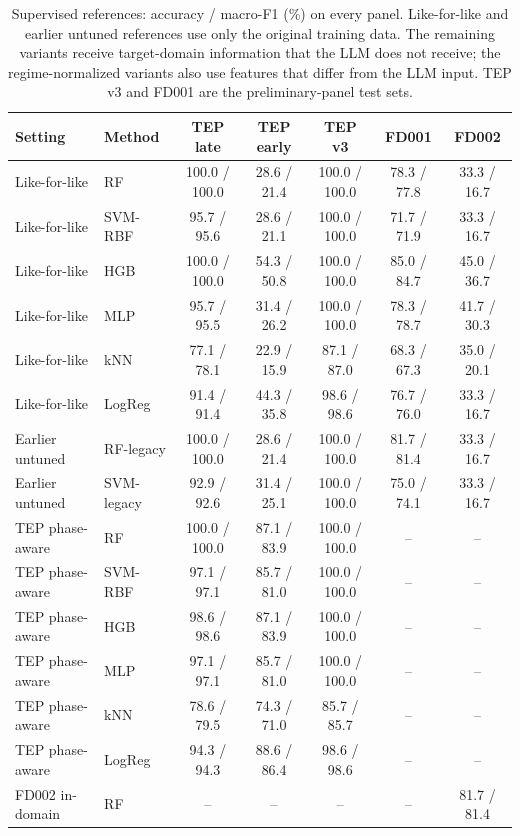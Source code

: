 \begin{table}[htbp]\centering\scriptsize
\caption{Supervised references: accuracy / macro-F1 (\%) on every panel. Like-for-like and earlier untuned references use only the original training data. The remaining variants receive target-domain information that the LLM does not receive; the regime-normalized variants also use features that differ from the LLM input. TEP v3 and FD001 are the preliminary-panel test sets.}
\label{tab:sh_baselines}
\setlength{\tabcolsep}{3pt}
\begin{tabular}{@{}llccccc@{}}\toprule
Setting & Method & TEP late & TEP early & TEP v3 & FD001 & FD002 \\\midrule
Like-for-like & RF & 100.0 / 100.0 & 28.6 / 21.4 & 100.0 / 100.0 & 78.3 / 77.8 & 33.3 / 16.7 \\
Like-for-like & SVM-RBF & 95.7 / 95.6 & 28.6 / 21.1 & 100.0 / 100.0 & 71.7 / 71.9 & 33.3 / 16.7 \\
Like-for-like & HGB & 100.0 / 100.0 & 54.3 / 50.8 & 100.0 / 100.0 & 85.0 / 84.7 & 45.0 / 36.7 \\
Like-for-like & MLP & 95.7 / 95.5 & 31.4 / 26.2 & 100.0 / 100.0 & 78.3 / 78.7 & 41.7 / 30.3 \\
Like-for-like & kNN & 77.1 / 78.1 & 22.9 / 15.9 & 87.1 / 87.0 & 68.3 / 67.3 & 35.0 / 20.1 \\
Like-for-like & LogReg & 91.4 / 91.4 & 44.3 / 35.8 & 98.6 / 98.6 & 76.7 / 76.0 & 33.3 / 16.7 \\
Earlier untuned & RF-legacy & 100.0 / 100.0 & 28.6 / 21.4 & 100.0 / 100.0 & 81.7 / 81.4 & 33.3 / 16.7 \\
Earlier untuned & SVM-legacy & 92.9 / 92.6 & 31.4 / 25.1 & 100.0 / 100.0 & 75.0 / 74.1 & 33.3 / 16.7 \\
TEP phase-aware & RF & 100.0 / 100.0 & 87.1 / 83.9 & 100.0 / 100.0 & -- & -- \\
TEP phase-aware & SVM-RBF & 97.1 / 97.1 & 85.7 / 81.0 & 100.0 / 100.0 & -- & -- \\
TEP phase-aware & HGB & 98.6 / 98.6 & 87.1 / 83.9 & 100.0 / 100.0 & -- & -- \\
TEP phase-aware & MLP & 97.1 / 97.1 & 85.7 / 81.0 & 100.0 / 100.0 & -- & -- \\
TEP phase-aware & kNN & 78.6 / 79.5 & 74.3 / 71.0 & 85.7 / 85.7 & -- & -- \\
TEP phase-aware & LogReg & 94.3 / 94.3 & 88.6 / 86.4 & 98.6 / 98.6 & -- & -- \\
FD002 in-domain & RF & -- & -- & -- & -- & 81.7 / 81.4 \\

\end{tabular}
\end{table}

